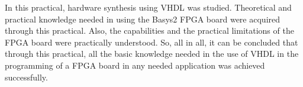 In this practical, hardware synthesis using VHDL was studied. Theoretical and practical knowledge needed in using the Basys2 FPGA board were acquired through this practical. Also, the capabilities and the  practical 
limitations of the FPGA board were practically understood. So, all in all, it can be concluded
that through this practical, all the basic knowledge needed in the use of VHDL in the programming of a FPGA board in any needed application was achieved successfully.
